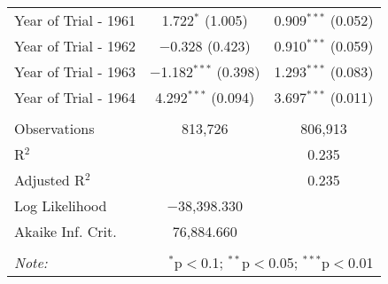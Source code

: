 \begin{table}[!h]
\begin{tabular}{@{\extracolsep{5pt}}lcc}
  Year of Trial - 1961 & 1.722$^{*}$ (1.005) & 0.909$^{***}$ (0.052) \\ 
  Year of Trial - 1962 & $-$0.328 (0.423) & 0.910$^{***}$ (0.059) \\ 
  Year of Trial - 1963 & $-$1.182$^{***}$ (0.398) & 1.293$^{***}$ (0.083) \\ 
  Year of Trial - 1964 & 4.292$^{***}$ (0.094) & 3.697$^{***}$ (0.011) \\ 
 \hline \\[-1.8ex] 
Observations & 813,726 & 806,913 \\ 
R$^{2}$ &  & 0.235 \\ 
Adjusted R$^{2}$ &  & 0.235 \\ 
Log Likelihood & $-$38,398.330 &  \\ 
Akaike Inf. Crit. & 76,884.660 &  \\ 
\hline 
\hline \\[-1.8ex] 
\textit{Note:}  & \multicolumn{2}{r}{$^{*}$p$<$0.1; $^{**}$p$<$0.05; $^{***}$p$<$0.01} \\ 
\end{tabular} 
\end{table} 
